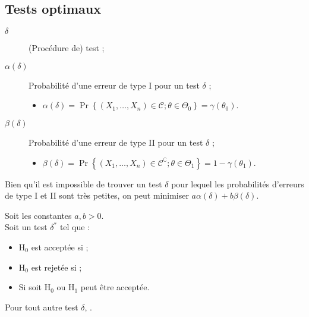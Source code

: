 \documentclass[10pt, french]{article}
\begin{document}
\begin{multicols*}{2}
\subsection{Tests optimaux}
\begin{distributions}[Notation]
\begin{description}
	\item[$\delta$]	(Procédure de) test ;
	\item[$\alpha(\delta)$]	Probabilité d'une erreur de type I pour un test $\delta$ ;
		\begin{itemize}
		\item	$\alpha(\delta)	=	\Pr\left\{(X_{1}, \dots, X_{n}) \in \mathcal{C} ;  \theta \in \Theta_{0}\right\}	=	\gamma(\theta_{0})$.
		\end{itemize}
	\item[$\beta(\delta)$]	Probabilité d'une erreur de type II pour un test $\delta$ ;
		\begin{itemize}
		\item	$\beta(\delta)	=	\Pr\left\{(X_{1}, \dots, X_{n}) \in \mathcal{C}^{\complement} ;  \theta \in \Theta_{1}\right\}	=	1 - \gamma(\theta_{1})$.
		\end{itemize}
\end{description}
\end{distributions}

\begin{definitionNOHFILLprop}
Bien qu'il est impossible de trouver un test $\delta$ pour lequel les probabilités d'erreurs de type I et II sont très petites, on peut minimiser $a\alpha(\delta) + b\beta(\delta)$.

\tcbline

Soit les constantes $a, b > 0$.\\
Soit un test $\delta^{*}$ tel que :
\begin{itemize}
	\item	 $\mathrm{H}_{0}$ est acceptée si  ;
	\item	 $\mathrm{H}_{0}$ est rejetée si  ;
	\item	Si  soit $\mathrm{H}_{0}$ ou $\mathrm{H}_{1}$ peut être acceptée.
\end{itemize}

Pour tout autre test $\delta$, .
\end{definitionNOHFILLprop}


\end{multicols*}
\end{document}
